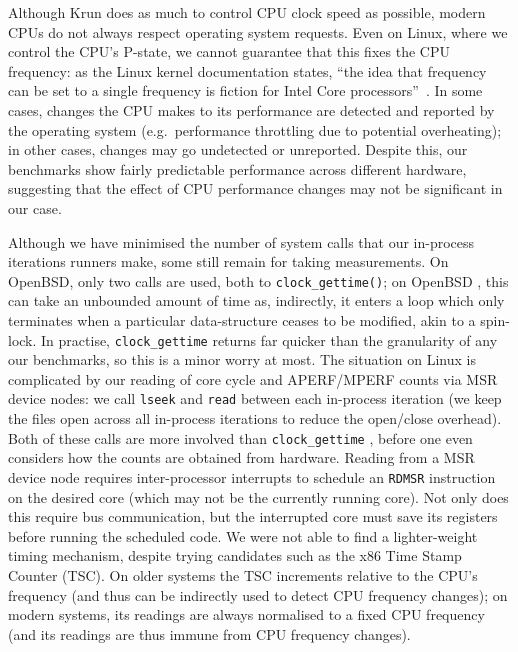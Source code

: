 \documentclass[preprint,numbers,10pt]{sigplanconf}
\newcommand{\krun}{Krun\xspace}
\begin{document}
 Although \krun does as much to control CPU clock speed as possible, modern CPUs
do not always respect operating system requests. Even on Linux, where we control
the CPU's P-state, we cannot guarantee that this fixes the CPU frequency: as
the Linux kernel documentation states, ``the idea that frequency can be set to a single
frequency is fiction for Intel Core processors''~\cite{pstate}. In
some cases, changes the CPU makes to its performance are detected and reported
by the operating system (e.g.~performance throttling due to potential
overheating); in other cases, changes may go undetected or unreported.
Despite this, our benchmarks show fairly predictable performance across
different hardware, suggesting that the effect of CPU performance changes may
not be significant in our case.

Although we have minimised the number of system calls that our in-process
iterations runners make, some still remain for taking measurements. On
OpenBSD, only two calls are used, both to \texttt{clock\_gettime()};
on OpenBSD , this can take an
unbounded amount of time as, indirectly, it enters a loop which only terminates
when a particular data-structure ceases to be modified, akin to a spin-lock. In
practise, \texttt{clock\_gettime} returns far quicker than the granularity
of any our benchmarks, so this is a minor worry at most. The situation
on Linux is complicated by our reading of core cycle and APERF/MPERF
counts via MSR device nodes: we call \texttt{lseek} and \texttt{read}
between each in-process iteration (we keep the files open across all
in-process iterations to reduce the open/close overhead). Both of
these calls are more involved than \texttt{clock\_gettime} , before one even considers how the counts are obtained from
hardware. Reading from a MSR device node requires inter-processor interrupts to
schedule an \texttt{RDMSR} instruction on the desired core (which may not be the
currently running core). Not only does this require bus communication, but the
interrupted core must save its registers before running the scheduled code. We
were not able to find a lighter-weight timing mechanism, despite trying
candidates such as the x86 Time Stamp Counter (TSC). On older systems the TSC
increments relative to the CPU's frequency (and thus can be indirectly used to
detect CPU frequency changes); on modern systems, its readings are always
normalised to a fixed CPU frequency (and its readings are thus immune from CPU
frequency changes).
\end{document}
